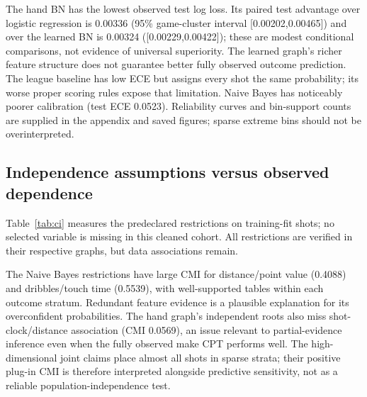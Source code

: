 \documentclass{article}
\begin{document}
\begin{table}[ht]
\caption{Synchronized validation and final random-game test results. LL denotes
log loss. Lower LL/Brier/ECE and higher accuracy are better.}
\label{tab:main}\centering\small
\end{table}

The hand BN has the lowest observed test log loss. Its paired test advantage over
logistic regression is 0.00336 (95\% game-cluster interval [0.00202,0.00465]) and
over the learned BN is 0.00324 ([0.00229,0.00422]); these are modest conditional
comparisons, not evidence of universal superiority. The learned graph's richer
feature structure does not guarantee better fully observed outcome prediction.
The league baseline has low ECE but assigns every shot the same probability;
its worse proper scoring rules expose that limitation. Naive Bayes has noticeably
poorer calibration (test ECE 0.0523). Reliability curves and bin-support counts
are supplied in the appendix and saved figures; sparse extreme bins should not
be overinterpreted.

\subsection{Independence assumptions versus observed dependence}
Table~\ref{tab:ci} measures the predeclared restrictions on \FitN{} training-fit
shots; no selected variable is missing in this cleaned cohort. All restrictions
are verified in their respective graphs, but data associations remain.

\begin{table}[ht]
\caption{Descriptive CMI and percentage of all analyzed shots lying in informative
strata with any expected cell count below five. CMI is not a formal cluster-valid CI test.}
\label{tab:ci}\centering\small
\end{table}

The Naive Bayes restrictions have large CMI for distance/point value (0.4088) and
dribbles/touch time (0.5539), with well-supported tables within each outcome stratum. Redundant
feature evidence is a plausible explanation for its overconfident probabilities.
The hand graph's independent roots also miss shot-clock/distance association
(CMI 0.0569), an issue relevant to partial-evidence inference even when the fully
observed make CPT performs well. The high-dimensional joint claims place almost
all shots in sparse strata; their positive plug-in CMI is therefore interpreted
alongside predictive sensitivity, not as a reliable population-independence test.
\end{document}
